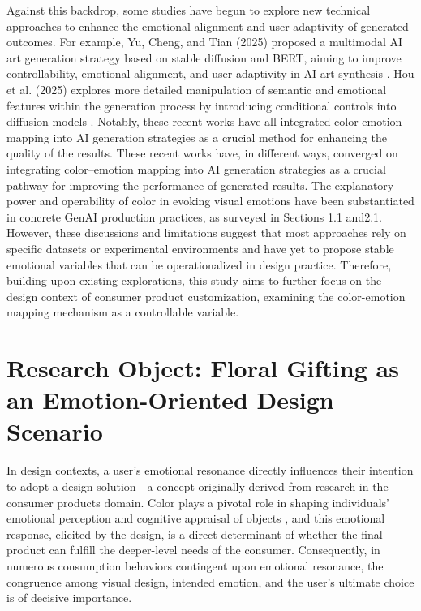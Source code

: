 Against this backdrop, some studies have begun to explore new technical approaches to enhance the emotional alignment and user adaptivity of generated outcomes. For example, Yu, Cheng, and Tian (2025) proposed a multimodal AI art generation strategy based on stable diffusion and BERT, aiming to improve controllability, emotional alignment, and user adaptivity in AI art synthesis \cite{yuArtificialIntelligenceAIdriven2025}. Hou et al. (2025) explores more detailed manipulation of semantic and emotional features within the generation process by introducing conditional controls into diffusion models \cite{houGenColorGenerativeColorconcept2025}. Notably, these recent works have all integrated color-emotion mapping into AI generation strategies as a crucial method for enhancing the quality of the results. These recent works have, in different ways, converged on integrating color–emotion mapping into AI generation strategies as a crucial pathway for improving the performance of generated results. The explanatory power and operability of color in evoking visual emotions have been substantiated in concrete GenAI production practices, as surveyed in Sections 1.1 and2.1. However, these discussions and limitations suggest that most approaches rely on specific datasets or experimental environments and have yet to propose stable emotional variables that can be operationalized in design practice. Therefore, building upon existing explorations, this study aims to further focus on the design context of consumer product customization, examining the color-emotion mapping mechanism as a controllable variable.

\section{Research Object: Floral Gifting as an Emotion-Oriented Design Scenario}

In design contexts, a user's emotional resonance directly influences their intention to adopt a design solution—a concept originally derived from research in the consumer products domain. Color plays a pivotal role in shaping individuals' emotional perception and cognitive appraisal of objects \cite{elliotColorPsychologyEffects2014,yaoVisualPerformancePainting2022}, and this emotional response, elicited by the design, is a direct determinant of whether the final product can fulfill the deeper-level needs of the consumer. Consequently, in numerous consumption behaviors contingent upon emotional resonance, the congruence among visual design, intended emotion, and the user's ultimate choice is of decisive importance.

